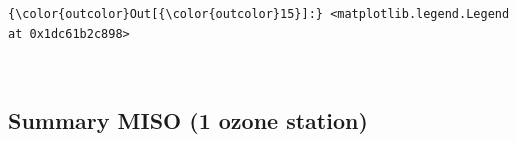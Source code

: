 \documentclass[11pt]{article}
\begin{document}
\begin{Verbatim}[commandchars=\\\{\}]
{\color{outcolor}Out[{\color{outcolor}15}]:} <matplotlib.legend.Legend at 0x1dc61b2c898>
\end{Verbatim}
            
    \begin{center}
    \end{center}
    { \hspace*{\fill} \\}
    
    \hypertarget{summary-miso-1-ozone-station}{%
\subsection{Summary MISO (1 ozone
station)}\label{summary-miso-1-ozone-station}}
\end{document}
